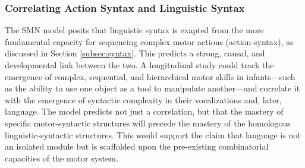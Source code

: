 \subsubsection{Correlating Action Syntax and Linguistic Syntax}
\label{ssubsec:syntax_test}
The SMN model posits that linguistic syntax is exapted from the more fundamental capacity for sequencing complex motor actions (action-syntax), as discussed in Section \ref{subsec:syntax}. This predicts a strong, causal, and developmental link between the two. A longitudinal study could track the emergence of complex, sequential, and hierarchical motor skills in infants—such as the ability to use one object as a tool to manipulate another—and correlate it with the emergence of syntactic complexity in their vocalizations and, later, language. The model predicts not just a correlation, but that the mastery of specific motor-syntactic structures will precede the mastery of the homologous linguistic-syntactic structures. This would support the claim that language is not an isolated module but is scaffolded upon the pre-existing combinatorial capacities of the motor system.